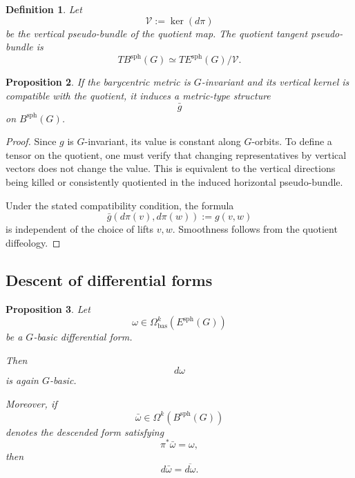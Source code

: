 \documentclass[11pt]{amsart}
\newtheorem{definition}{Definition}[section]
\newtheorem{proposition}[definition]{Proposition}
\begin{document}
\begin{definition}
Let
\[
\mathcal V:=\ker(d\pi)
\]
be the vertical pseudo-bundle of the quotient map. The quotient tangent pseudo-bundle is
\[
TB^{\mathrm{sph}}(G)
\simeq
TE^{\mathrm{sph}}(G)/\mathcal V.
\]
\end{definition}

\begin{proposition}
If the barycentric metric is \(G\)-invariant and its vertical kernel is compatible with the quotient, it induces a metric-type structure
\[
\bar g
\]
on \(B^{\mathrm{sph}}(G)\).
\end{proposition}

\begin{proof}
Since \(g\) is \(G\)-invariant, its value is constant along \(G\)-orbits. To define a tensor on the quotient, one must verify that changing representatives by vertical vectors does not change the value. This is equivalent to the vertical directions being killed or consistently quotiented in the induced horizontal pseudo-bundle.

Under the stated compatibility condition, the formula
\[
\bar g(d\pi(v),d\pi(w)):=g(v,w)
\]
is independent of the choice of lifts \(v,w\). Smoothness follows from the quotient diffeology.
\end{proof}

\subsection{Descent of differential forms}

\begin{proposition}
Let
\[
\omega\in\Omega^k_{\mathrm{bas}}(E^{\mathrm{sph}}(G))
\]
be a \(G\)-basic differential form.

Then
\[
d\omega
\]
is again \(G\)-basic.

Moreover, if
\[
\bar\omega\in\Omega^k(B^{\mathrm{sph}}(G))
\]
denotes the descended form satisfying
\[
\pi^*\bar\omega=\omega,
\]
then
\[
d\bar\omega
=
\overline{d\omega}.
\]
\end{proposition}
\end{document}
